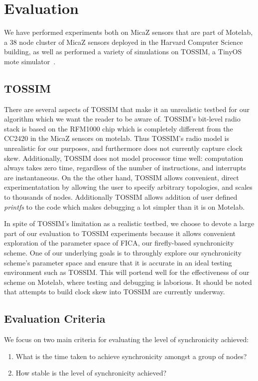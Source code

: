 \section{Evaluation}
\label{sec:evaluation}

We have performed experiments both on MicaZ sensors that are part of Motelab, a 38 node
cluster of MicaZ sensors deployed in the Harvard Computer Science building,
as well as performed a variety of simulations on TOSSIM, a TinyOS mote simulator~\cite{hill00}.

\subsection{TOSSIM}
There are several aspects of TOSSIM that make it an unrealistic testbed for
our algorithm which we want the reader to be aware of.
TOSSIM's bit-level radio stack is based on the RFM1000 chip 
which is completely different from the CC2420 in the MicaZ sensors on motelab. 
Thus TOSSIM's radio model is unrealistic for our purposes, 
and furthermore does not currently capture clock skew.  
Additionally, TOSSIM does not model processor time well: 
computation always takes zero time, regardless of the number of instructions, 
and interrupts are instantaneous.
On the the other hand, TOSSIM allows convenient,
direct experimentatation by allowing the user to specify arbitrary topologies, 
and scales to thousands of nodes. Additionally TOSSIM allows addition of user
defined \emph{printfs} to the code which makes debugging a lot simpler
than it is on Motelab.  

In spite of TOSSIM's limitation as a realistic testbed, we choose to 
devote a large part of our evaluation to TOSSIM experiments because it
allows convenient exploration of the parameter space of FICA, our
firefly-based synchronicity scheme. One of our underlying goals is to
throughly explore our synchronicity scheme's parameter space and 
ensure that it is accurate in an ideal testing environment such as TOSSIM.
This will portend well for the effectiveness of our scheme on Motelab, where
testing and debugging is laborious.  It should be noted that attempts to
build clock skew into TOSSIM are currently underway. \\

\subsection{Evaluation Criteria}
\noindent
We focus on two main criteria for evaluating the level of synchronicity achieved:
\begin{enumerate}\addtolength{\itemsep}{-0.5\baselineskip}
\item What is the time taken to achieve synchronicity amongst a group of nodes?
\item How stable is the level of synchronicity achieved?
\end{enumerate}

